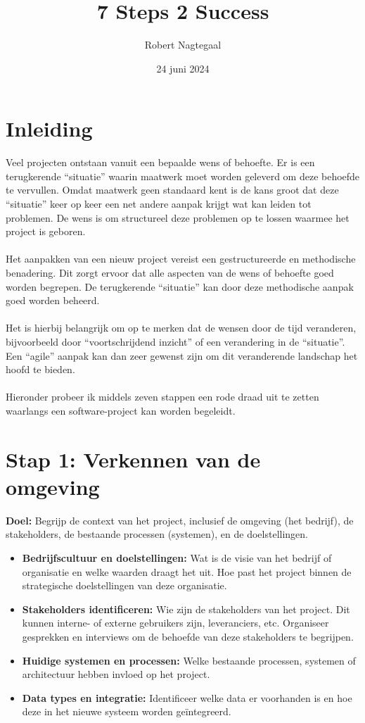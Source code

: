 \documentclass[8pt]{extarticle}
\title{7 Steps 2 Success}
\author{Robert Nagtegaal}
\date{24 juni 2024}
\begin{document}
\maketitle


\section*{Inleiding}
\noindent Veel projecten ontstaan vanuit een bepaalde wens of behoefte. Er is een terugkerende “situatie” waarin maatwerk moet worden geleverd om deze behoefde te vervullen. Omdat maatwerk geen standaard kent is de kans groot dat deze “situatie” keer op keer een net andere aanpak krijgt wat kan leiden tot problemen. De wens is om structureel deze problemen op te lossen waarmee het project is geboren.\\
\\
Het aanpakken van een nieuw project vereist een gestructureerde en methodische benadering. Dit zorgt ervoor dat alle aspecten van de wens of behoefte goed worden begrepen. De terugkerende “situatie” kan door deze methodische aanpak goed worden beheerd.\\
\\
Het is hierbij belangrijk om op te merken dat de wensen door de tijd veranderen, bijvoorbeeld door “voortschrijdend inzicht” of een verandering in de “situatie”. Een “agile” aanpak kan dan zeer gewenst zijn om dit veranderende landschap het hoofd te bieden.\\
\\
Hieronder probeer ik middels zeven stappen een rode draad uit te zetten waarlangs een software-project kan worden begeleidt.

\newpage

%
%

\section*{Stap 1: Verkennen van de omgeving}
\textbf{Doel:} Begrijp de context van het project, inclusief de omgeving (het bedrijf), de stakeholders, de bestaande processen (systemen), en de doelstellingen.

\begin{itemize}
    \item \textbf{Bedrijfscultuur en doelstellingen:} Wat is de visie van het bedrijf of organisatie en welke waarden draagt het uit. Hoe past het project binnen de strategische doelstellingen van deze organisatie.
    \item \textbf{Stakeholders identificeren:} Wie zijn de stakeholders van het project. Dit kunnen interne- of externe gebruikers zijn, leveranciers, etc.  Organiseer gesprekken en interviews om de behoefde van deze stakeholders te begrijpen.
    \item \textbf{Huidige systemen en processen:} Welke bestaande processen, systemen of architectuur hebben invloed op het project. 
    \item \textbf{Data types en integratie:} Identificeer welke data er voorhanden is en hoe deze in het nieuwe systeem worden geïntegreerd.
\end{itemize}
\end{document}
